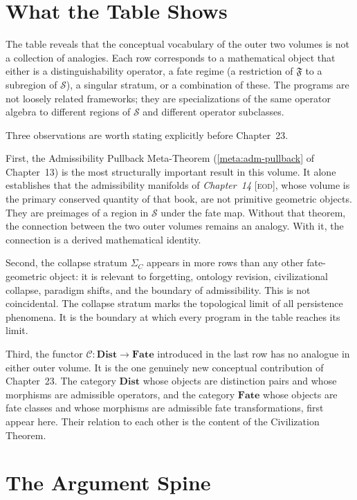 \documentclass[12pt,twoside,openright]{book}
\newcommand{\fateMap}{\mathfrak{F}}
\newcommand{\fateSpace}{\mathcal{S}}
\newcommand{\EOD}[1]{\textit{#1} [\textsc{eod}]}
\newcommand{\strataC}{\Sigma_{C}}   %
\newcommand{\catDist}{\mathbf{Dist}}
\newcommand{\catFate}{\mathbf{Fate}}
\newcommand{\civFunc}{\mathcal{C}}
\providecommand{\strataC}{\Sigma_{C}}
\providecommand{\catDist}{\mathbf{Dist}}
\providecommand{\catFate}{\mathbf{Fate}}
\providecommand{\civFunc}{\mathcal{C}}
\begin{document}
\section{What the Table Shows}

The table reveals that the conceptual vocabulary of the outer
two volumes is not a collection of analogies. Each row
corresponds to a mathematical object that either is a
distinguishability operator, a fate regime (a restriction of
$\fateMap$ to a subregion of $\fateSpace$), a singular stratum,
or a combination of these. The programs are not
loosely related frameworks; they are specializations of the
same operator algebra to different regions of $\fateSpace$ and
different operator subclasses.

Three observations are worth stating explicitly before
Chapter~23.

First, the Admissibility Pullback Meta-Theorem
(\cref{meta:adm-pullback} of Chapter~13) is the most
structurally important result in this volume. It alone
establishes that the admissibility manifolds of
\EOD{Chapter~14}, whose volume is the primary conserved
quantity of that book, are not primitive geometric objects. They
are preimages of a region in $\fateSpace$ under the fate map.
Without that theorem, the connection between the two outer
volumes remains an analogy. With it, the connection is a
derived mathematical identity.

Second, the collapse stratum $\strataC$ appears in more rows
than any other fate-geometric object: it is relevant to
forgetting, ontology revision, civilizational collapse, paradigm
shifts, and the boundary of admissibility. This is not
coincidental. The collapse stratum marks the topological limit
of all persistence phenomena. It is the boundary at which every
program in the table reaches its limit.

Third, the functor $\civFunc:\catDist\to\catFate$ introduced in
the last row has no analogue in either outer volume. It is the
one genuinely new conceptual contribution of Chapter~23. The
category $\catDist$ whose objects are distinction pairs and
whose morphisms are admissible operators, and the category
$\catFate$ whose objects are fate classes and whose morphisms
are admissible fate transformations, first appear here. Their
relation to each other is the content of the Civilization
Theorem.

\section{The Argument Spine}
\end{document}
